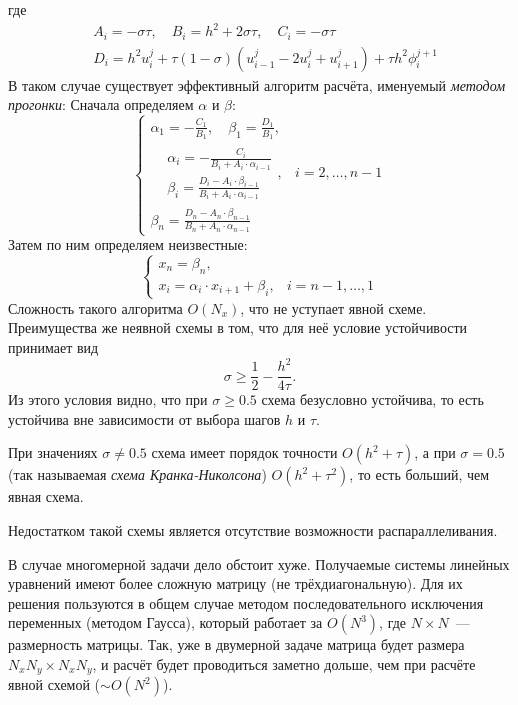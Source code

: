 где 
\begin{align*}
    & A_i = -\sigma \tau, \quad  B_i = h^2 + 2\sigma \tau, \quad C_i = -\sigma \tau\\
    & D_i = h^2 u_i^j + \tau (1 - \sigma) \left( 
        u_{i - 1}^j - 2u_i^j + u_{i + 1}^j
     \right) + \tau h^2 \phi_i^{j + 1}
\end{align*}
В таком случае существует эффективный алгоритм расчёта, именуемый \emph{методом прогонки}:
Сначала определяем $\alpha$ и $\beta$:
$$
    \begin{cases}
        \alpha_1 = -\frac{C_1}{B_1}, \quad \beta_1 = \frac{D_1}{B_1},\\
        \begin{aligned}
            & \textstyle\alpha_i = -\frac{C_i}{B_i + A_i \cdot \alpha_{i-1}}\\
            & \textstyle\beta_i = \frac{D_i - A_i \cdot \beta_{i-1}}{B_i + A_i \cdot \alpha_{i-1}}
        \end{aligned}, & i = 2, \ldots, n-1\\
        \beta_n = \frac{D_n - A_n \cdot \beta_{n-1}}{B_n + A_n \cdot \alpha_{n-1}}
    \end{cases}
$$
Затем по ним определяем неизвестные:
$$
    \begin{cases}
        x_n = \beta_n,\\
        x_i = \alpha_i \cdot x_{i+1} + \beta_i, & i = n-1, \ldots, 1
    \end{cases}
$$
Сложность такого алгоритма $O(N_x)$, что не уступает явной схеме.
Преимущества же неявной схемы в том, что для неё условие устойчивости принимает вид
\begin{equation*}
    \sigma \geqslant \frac{1}{2} - \frac{h^2}{4\tau}.
\end{equation*}
Из этого условия видно, что при $\sigma \ge 0.5$ схема безусловно устойчива, то есть устойчива вне зависимости от выбора шагов $h$ и $\tau$.

При значениях $\sigma \ne 0.5$ схема имеет порядок точности $O(h^2 + \tau)$, а при $\sigma = 0.5$ (так называемая \emph{схема Кранка-Николсона}) $O(h^2 + \tau^2)$, то есть больший, чем явная схема.

Недостатком такой схемы является отсутствие возможности распараллеливания.

В случае многомерной задачи дело обстоит хуже.
Получаемые системы линейных уравнений имеют более сложную матрицу (не трёхдиагональную). Для их решения пользуются в общем случае методом последовательного исключения переменных (методом Гаусса), который работает за $O(N^3)$, где $N \times N$~--- размерность матрицы.
Так, уже в двумерной задаче матрица будет размера $N_xN_y \times N_x N_y$, и расчёт будет проводиться заметно дольше, чем при расчёте явной схемой ($\sim O(N^2)$).